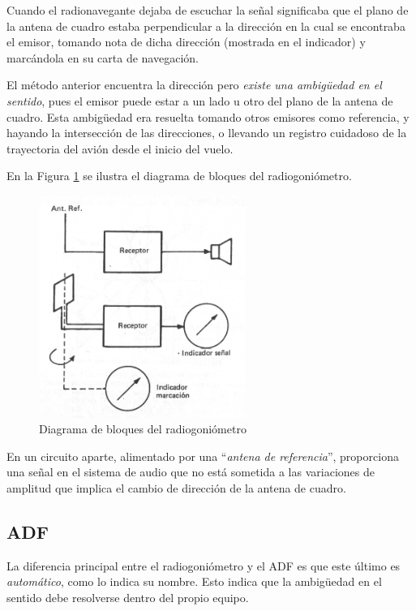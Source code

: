 Cuando el radionavegante dejaba de escuchar la se\~nal significaba que el plano de la antena de cuadro estaba perpendicular a la direcci\'on en la cual se encontraba el emisor, tomando nota de dicha direcci\'on (mostrada en el indicador) y marc\'andola en su carta de navegaci\'on.

El m\'etodo anterior encuentra la direcci\'on pero \emph{existe una ambigüedad en el sentido}, pues el emisor puede estar a un lado u otro del plano de la antena de cuadro. Esta ambigüedad era resuelta tomando otros emisores como referencia, y hayando la intersecci\'on de las direcciones, o llevando un registro cuidadoso de la trayectoria del avi\'on desde el inicio del vuelo.

En la Figura \ref{fig:diag-bloques-radiogoniometro} se ilustra el diagrama de bloques del radiogoni\'ometro.


\begin{figure}[!h]
  \centering
   \includegraphics[width=0.6\textwidth]{Imagenes/06.01.adf/diag-bloques-radiogoniometro.png}
  \caption{Diagrama de bloques del radiogoni\'ometro}
  \label{fig:diag-bloques-radiogoniometro}
\end{figure}


En un circuito aparte, alimentado por una ``\emph{antena de referencia}'', proporciona una se\~nal en el sistema de audio que no est\'a sometida a las variaciones de amplitud que implica el cambio de direcci\'on de la antena de cuadro.


\subsection{ADF}

La diferencia principal entre el radiogoni\'ometro y el ADF es que este \'ultimo es \emph{autom\'atico}, como lo indica su nombre. Esto indica que la ambigüedad en el sentido debe resolverse dentro del propio equipo.

